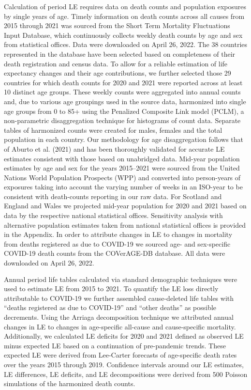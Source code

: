 \documentclass[12pt]{article}
\begin{document}
Calculation of period LE requires data on death counts and population exposures by single years of age. Timely information on death counts across all causes from 2015 through 2021 was sourced from the Short Term Mortality Fluctuations Input Database,\citealp{Jdanov2021, Nemeth2021} which continuously collects weekly death counts by age and sex from statistical offices. Data were downloaded on April 26, 2022. The 38 countries represented in the database have been selected based on completeness of their death registration and census data. To allow for a reliable estimation of life expectancy changes and their age contributions, we further selected those 29 countries for which death counts for 2020 and 2021 were reported across at least 10 distinct age groups. These weekly counts were aggregated into annual counts and, due to various age groupings used in the source data, harmonized into single age groups from 0 to 85+ using the Penalized Composite Link model (PCLM),\citealp{Rizzi2015, Pascariu2018} a non-parametric disaggregation technique for histograms of count data. Separate tables of harmonized counts were created for males, females and the total population in each country. Our methodology for age disaggregation follows that of Aburto et al. (2021)\citealp{Aburto2021b} and has been thoroughly validated for accurate LE estimates consistent with those based on unabridged data. Mid-year population estimates by age and sex for the years 2015--2021 were sourced from the United Nations World Population Prospects (WPP)\citealp{UnitedNations2021} and converted into person-years of exposures taking into account the varying number of weeks in an ISO-year \citealp{IOS2021} to be consistent with death-counts reporting in our raw data. For Scotland and England and Wales we projected mid-year population for 2020 and 2021 based on data by the respective national statistical offices. Sensitivity analysis with alternative population estimates taken from national statistical offices is provided in the Appendix. In order to attribute changes in LE to changes in mortality from deaths registered as due to COVID-19 we sourced age- and sex-specific COVID-19 death counts from the COVerAGE-DB database.\citealp{Riffe2021} All data were downloaded on April 26, 2022.

Annual period life tables calculated via standard demographic techniques\citealp{Chiang1979} were used to estimate LE from 2015 to 2021. To quantify the LE loss directly attributable to COVID-19 we further assembled cause-deleted life tables with ``deaths registered as due to COVID-19'' and ``other deaths'' as possible decrements.\citealp{Preston2001} Using the Arriaga decomposition technique\citealp{Arriaga1984} we attributed annual changes in LE to changes in age-specific all-cause and cause-specific mortality. Additionally, we calculated LE deficits for 2020 and 2021 defined as observed LE minus expected LE based on a continuation of pre-pandemic trends. These expected LE were derived from Lee-Carter forecasts\citealp{Lee1992} of age-specific death rates over the years 2015 through 2019. Confidence intervals around our LE estimates, LE differences, LE deficits, and LE decompositions were derived from 500 Poisson simulations of the harmonized death counts.
\end{document}
